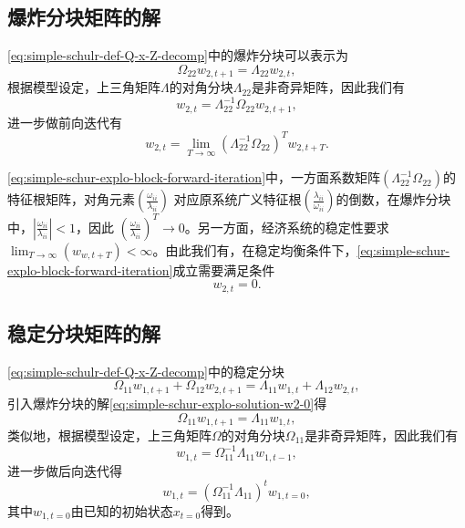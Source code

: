 \subsection{爆炸分块矩阵的解}
\eqref{eq:simple-schulr-def-Q-x-Z-decomp}中的爆炸分块可以表示为
\begin{equation*}
  \Omega_{22} w_{2,t+1} = \Lambda_{22} w_{2,t},
\end{equation*}
根据模型设定，上三角矩阵$\Lambda$的对角分块$\Lambda_{22}$是非奇异矩阵，因此我们有
\begin{equation*}
  w_{2,t} = \Lambda_{22}^{-1} \Omega_{22} w_{2,t+1},
\end{equation*}
进一步做前向迭代有
\begin{equation}
  \label{eq:simple-schur-explo-block-forward-iteration}
  w_{2,t} = \lim_{T \rightarrow \infty} \left( \Lambda_{22}^{-1} \Omega_{22} \right)^T w_{2,t+T}.
\end{equation}

\eqref{eq:simple-schur-explo-block-forward-iteration}中，一方面系数矩阵$\left( \Lambda_{22}^{-1} \Omega_{22} \right)$的特征根矩阵，对角元素$\left(\frac{\omega_{ii}}{\lambda_{ii}} \right)$ 对应原系统广义特征根$\left(\frac{\lambda_{ii}}{\omega_{ii}} \right)$的倒数，在爆炸分块中，$\left| \frac{\omega_{ii}}{\lambda_{ii}} \right| <1$，因此 $\left( \frac{\omega_{ii}}{\lambda_{ii}} \right)^T \rightarrow 0$。另一方面，经济系统的稳定性要求$\lim_{T \rightarrow \infty} \left(w_{w,t+T}\right) < \infty $。由此我们有，在稳定均衡条件下，\eqref{eq:simple-schur-explo-block-forward-iteration}成立需要满足条件
\begin{equation}
  \label{eq:simple-schur-explo-solution-w2-0}
  w_{2,t} = 0.
\end{equation}

\subsection{稳定分块矩阵的解}
\eqref{eq:simple-schulr-def-Q-x-Z-decomp}中的稳定分块
\begin{equation*}
  \Omega_{11} w_{1,t+1} + \Omega_{12} w_{2,t+1} = \Lambda_{11} w_{1,t} + \Lambda_{12} w_{2,t},
\end{equation*}
引入爆炸分块的解\eqref{eq:simple-schur-explo-solution-w2-0}得
\begin{equation*}
  \Omega_{11} w_{1,t+1} = \Lambda_{11} w_{1,t},
\end{equation*}
类似地，根据模型设定，上三角矩阵$\Omega$的对角分块$\Omega_{11}$是非奇异矩阵，因此我们有
\begin{equation*}
  w_{1,t} = \Omega_{11}^{-1} \Lambda_{11} w_{1,t-1},
\end{equation*}
进一步做后向迭代得
\begin{equation}
  \label{eq:simple-schur-stable-block-backward-iteration}
  w_{1,t} = \left( \Omega_{11}^{-1} \Lambda_{11}\right)^t w_{1,t=0},
\end{equation}
其中$w_{1,t=0}$由已知的初始状态$x_{t=0}$得到。

